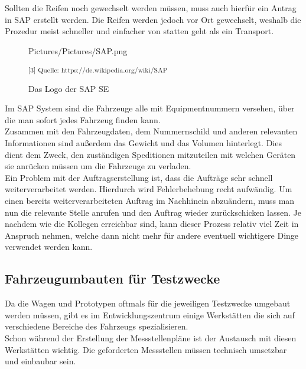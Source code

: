 Sollten die Reifen noch gewechselt werden müssen, muss auch hierfür ein Antrag in SAP erstellt werden. Die Reifen werden jedoch vor Ort gewechselt, weshalb die Prozedur meist schneller und einfacher von statten geht als ein Transport. \\

\begin{figure}[H]
	\begin{center}
		\begin{overpic}[width=\linewidth]{Pictures/Pictures/SAP.png}
			
		\end{overpic}
		\label{SAP}
		\caption{Das Logo der SAP SE}
		\small\textsuperscript{[3] Quelle: https://de.wikipedia.org/wiki/SAP}
	\end{center}
\end{figure}

Im SAP System sind die Fahrzeuge alle mit Equipmentnummern versehen, über die man sofort jedes Fahrzeug finden kann. \\
Zusammen mit den Fahrzeugdaten, dem Nummernschild und anderen relevanten Informationen sind außerdem das Gewicht und das Volumen hinterlegt. Dies dient dem Zweck, den zuständigen Speditionen mitzuteilen mit welchen Geräten sie anrücken müssen um die Fahrzeuge zu verladen. \\

Ein Problem mit der Auftragserstellung ist, dass die Aufträge sehr schnell weiterverarbeitet werden. Hierdurch wird Fehlerbehebung recht aufwändig. Um einen bereits weiterverarbeiteten Auftrag im Nachhinein abzuändern, muss man nun die relevante Stelle anrufen und den Auftrag wieder zurückschicken lassen. Je nachdem wie die Kollegen erreichbar sind, kann dieser Prozess relativ viel Zeit in Anspruch nehmen, welche dann nicht mehr für andere eventuell wichtigere Dinge verwendet werden kann.\\

\subsection{Fahrzeugumbauten für Testzwecke}

Da die Wagen und Prototypen oftmals für die jeweiligen Testzwecke umgebaut werden müssen, gibt es im Entwicklungszentrum einige Werkstätten die sich auf verschiedene Bereiche des Fahrzeugs spezialisieren. \\
Schon während der Erstellung der Messstellenpläne ist der Austausch mit diesen Werkstätten wichtig. Die geforderten Messstellen müssen technisch umsetzbar und einbaubar sein. \\

